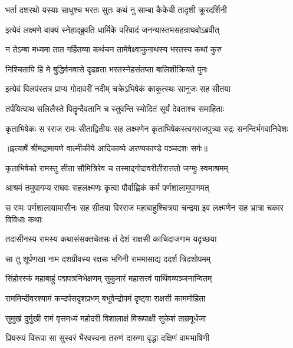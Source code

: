 \twolineshloka
{भर्ता दशरथो यस्याः साधुश्च भरतः सुतः}
{कथं नु साम्बा कैकेयी तादृशी क्रूरदर्शिनी} %

\twolineshloka
{इत्येवं लक्ष्मणे वाक्यं स्नेहाद्ब्रुवति धार्मिके}
{परिवादं जनन्यास्तमसहन्राघवोऽब्रवीत्} %

\twolineshloka
{न तेऽम्बा मध्यमा तात गर्हितव्या कथंचन}
{तामेवेक्ष्वाकुनाथस्य भरतस्य कथां कुरु} %

\twolineshloka
{निश्चितापि हि मे बुद्धिर्वनवासे दृढव्रता}
{भरतस्नेहसंतप्ता बालिशीक्रियते पुनः} %

\twolineshloka
{इत्येवं विलपंस्तत्र प्राप्य गोदावरीं नदीम्}
{चक्रेऽभिषेकं काकुत्स्थः सानुजः सह सीतया} %

\twolineshloka
{तर्पयित्वाथ सलिलैस्ते पितॄन्दैवतानि च}
{स्तुवन्ति स्मोदितं सूर्यं देवताश्च समाहिताः} %

\fourlineindentedshloka
{कृताभिषेकः स रराज रामः}
{ सीताद्वितीयः सह लक्ष्मणेन}
{कृताभिषेकस्त्वगराजपुत्र्या}
{ रुद्रः सनन्दिर्भगवानिवेशः} %


{॥इत्यार्षे श्रीमद्रामायणे वाल्मीकीये आदिकाव्ये अरण्यकाण्डे पञ्चदशः सर्गः॥}


\twolineshloka
{कृताभिषेको रामस्तु सीता सौमित्रिरेव च}
{तस्माद्गोदावरीतीरात्ततो जग्मुः स्वमाश्रमम्} %

\twolineshloka
{आश्रमं तमुपागम्य राघवः सहलक्ष्मणः}
{कृत्वा पौर्वाह्णिकं कर्म पर्णशालामुपागमत्} %

\threelineshloka
{स रामः पर्णशालायामासीनः सह सीतया}
{विरराज महाबाहुश्चित्रया चन्द्रमा इव}
{लक्ष्मणेन सह भ्रात्रा चकार विविधाः कथाः} %

\twolineshloka
{तदासीनस्य रामस्य कथासंसक्तचेतसः}
{तं देशं राक्षसी काचिदाजगाम यदृच्छया} %

\twolineshloka
{सा तु शूर्पणखा नाम दशग्रीवस्य रक्षसः}
{भगिनी राममासाद्य ददर्श त्रिदशोपमम्} %

\twolineshloka
{सिंहोरस्कं महाबाहुं पद्मपत्रनिभेक्षणम्}
{सुकुमारं महासत्त्वं पार्थिवव्यञ्जनान्वितम्} %

\twolineshloka
{राममिन्दीवरश्यामं कन्दर्पसदृशप्रभम्}
{बभूवेन्द्रोपमं दृष्ट्वा राक्षसी काममोहिता} %

\twolineshloka
{सुमुखं दुर्मुखी रामं वृत्तमध्यं महोदरी}
{विशालाक्षं विरूपाक्षी सुकेशं ताम्रमूर्धजा} %

\twolineshloka
{प्रियरूपं विरूपा सा सुस्वरं भैरवस्वना}
{तरुणं दारुणा वृद्धा दक्षिणं वामभाषिणी} %

